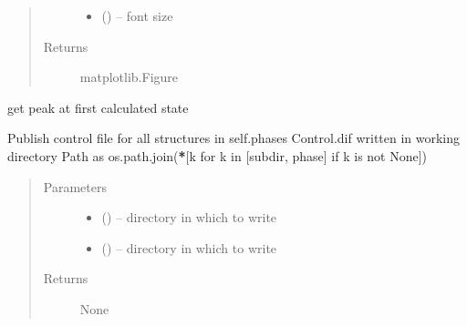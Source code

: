 \documentclass[letterpaper,10pt,english]{sphinxmanual}
\begin{document}
\begin{fulllineitems}
\begin{fulllineitems}
\begin{quote}
\begin{description}
\begin{itemize}
\item {} 
 () -- font size

\end{itemize}

\item[{Returns}] \leavevmode
matplotlib.Figure

\end{description}\end{quote}

\end{fulllineitems}


\begin{fulllineitems}
\label{\detokenize{rst/refinement:mstack.refinement.Refinement.preview}}
get peak at first calculated state

\end{fulllineitems}


\begin{fulllineitems}
\label{\detokenize{rst/refinement:mstack.refinement.Refinement.pub_control}}
Publish control file for all structures in self.phases
Control.dif written in working directory
Path as os.path.join({\color{red}\bfseries{}*}{[}k for k in {[}subdir, phase{]} if k is not None{]})
\begin{quote}\begin{description}
\item[{Parameters}] \leavevmode\begin{itemize}
\item {} 
 () -- directory in which to write

\item {} 
 () -- directory in which to write

\end{itemize}

\item[{Returns}] \leavevmode
None

\end{description}\end{quote}


\end{fulllineitems}
\end{fulllineitems}
\end{document}
